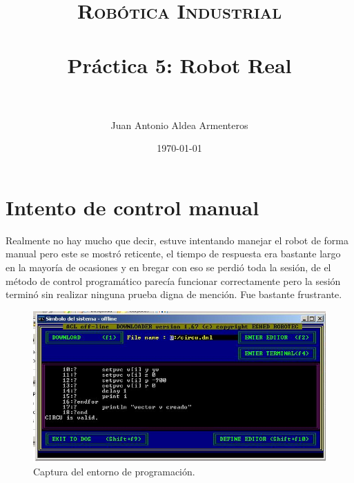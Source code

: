 \documentclass[paper=a4, fontsize=11pt]{scrreprt} %
\title{
    \normalfont \normalsize 
    \textsc{Robótica Industrial} \\ [25pt] %
    \horrule{0.5pt} \\[0.4cm] %
    \huge Práctica 5: Robot Real \\ %
    \horrule{2pt} \\[0.5cm] %
}
\author{Juan Antonio Aldea Armenteros} %
\date{\normalsize\today} %
\numberwithin{equation}{section} %
\numberwithin{figure}{section} %
\numberwithin{table}{section} %
\begin{document}
    \maketitle %
    \chapter{Intento de control manual}
    Realmente no hay mucho que decir, estuve intentando manejar el robot de forma manual pero este se mostró reticente, el tiempo de respuesta era bastante largo en la mayoría de ocasiones y en bregar con eso se perdió toda la sesión, de el método de control programático parecía funcionar correctamente pero la sesión terminó sin realizar ninguna prueba digna de mención. Fue bastante frustrante.
    \newline
    \begin{figure}[H]
        \centering
        \includegraphics[width=15cm]{imagenes/entorno_programacion.png}
        \caption{Captura del entorno de programación.}
    \end{figure}
\end{document}
